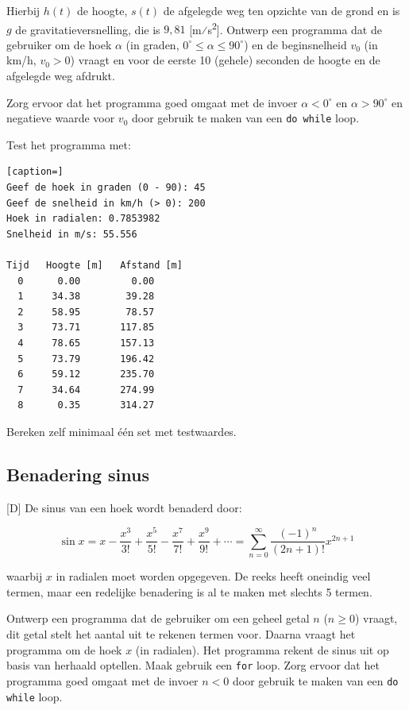 \documentclass[a4paper,10pt,fleqn,twoside]{article}
\begin{document}
Hierbij $h(t)$ de hoogte, $s(t)$ de afgelegde weg ten opzichte van de grond en is $g$ de gravitatieversnelling, die is $9,81$ [m⁄s\textsuperscript{2}]. Ontwerp een programma dat de gebruiker om de hoek $\alpha$ (in graden, $0^\circ \leq \alpha \leq 90^\circ$) en de beginsnelheid $v_0$ (in km/h, $v_0 > 0$) vraagt en voor de eerste 10 (gehele) seconden de hoogte en de afgelegde weg afdrukt.

Zorg ervoor dat het programma goed omgaat met de invoer $\alpha < 0^\circ$ en $\alpha > 90^\circ$ en negatieve waarde voor $v_0$ door gebruik te maken van een \lstinline|do while| loop.

Test het programma met:

\begin{lstlisting}[caption=]
Geef de hoek in graden (0 - 90): 45
Geef de snelheid in km/h (> 0): 200
Hoek in radialen: 0.7853982
Snelheid in m/s: 55.556

Tijd   Hoogte [m]   Afstand [m]
  0      0.00         0.00
  1     34.38        39.28
  2     58.95        78.57
  3     73.71       117.85
  4     78.65       157.13
  5     73.79       196.42
  6     59.12       235.70
  7     34.64       274.99
  8      0.35       314.27
\end{lstlisting}

Bereken zelf minimaal één set met testwaardes.

\subsection{Benadering sinus}[D]
De sinus van een hoek wordt benaderd door:

\begin{equation*}
\sin x = x - \dfrac{x^3}{3!} + \dfrac{x^5}{5!} - \dfrac{x^7}{7!} + \dfrac{x^9}{9!} + \cdots = \sum_{n=0}^\infty \dfrac{(-1)^n}{(2n+1)!} x^{2n+1}
\end{equation*}

waarbij $x$ in radialen moet worden opgegeven. De reeks heeft oneindig veel termen, maar een redelijke benadering is al te maken met slechts 5 termen.

Ontwerp een programma dat de gebruiker om een geheel getal $n$ ($n \geq 0$) vraagt, dit getal stelt het aantal uit te rekenen termen voor. Daarna vraagt het programma om de hoek $x$ (in radialen). Het programma rekent de sinus uit op basis van herhaald optellen. Maak gebruik een \lstinline|for| loop. Zorg ervoor dat het programma goed omgaat met de invoer $n < 0$ door gebruik te maken van een \lstinline|do while| loop.
\end{document}

